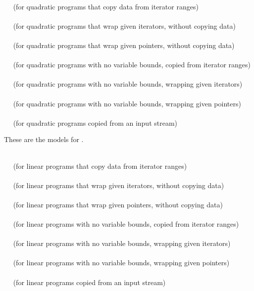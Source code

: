 \\
$\quad$ (for quadratic programs that copy data from iterator ranges) \\
\\
$\quad$ (for quadratic programs that wrap given iterators, without copying 
data) \\
\\
$\quad$ (for quadratic programs that wrap given pointers, without copying 
data) \\
\\
$\quad$ (for quadratic programs with no variable bounds, copied from iterator ranges)\\
\\
$\quad$ (for quadratic programs with no variable bounds, wrapping given iterators)\\
\\
$\quad$ (for quadratic programs with no variable bounds, wrapping given pointers)\\
\\
$\quad$ (for quadratic programs copied from an input stream)

These are the models for .

\\
$\quad$ (for linear programs that copy data from iterator ranges) \\
\\
$\quad$ (for linear programs that wrap given iterators, without copying 
data) \\
\\
$\quad$ (for linear programs that wrap given pointers, without copying 
data) \\
\\
$\quad$ (for linear programs with no variable bounds, copied from iterator ranges)\\
\\
$\quad$ (for linear programs with no variable bounds, wrapping given 
iterators)\\
\\
$\quad$ (for linear programs with no variable bounds, wrapping given 
pointers)\\
\\ 
$\quad$ (for linear programs copied from an input stream)


